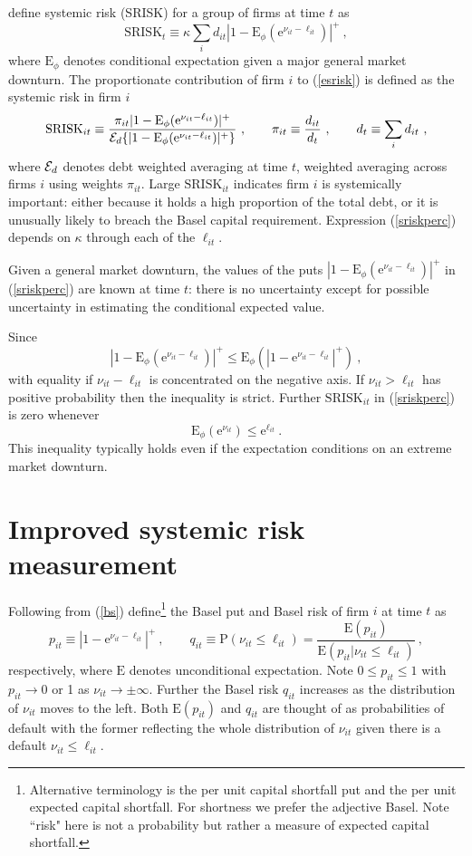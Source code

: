 \documentclass[authoryear]{elsarticle}
\newcommand{\E}{\mathrm{E}}
\newcommand{\p}{\mathrm{P}}
\newcommand{\e}{\mathrm{e}}
\newcommand{\Ex}{{\cal E}}
\newcommand{\Es}{\E_\phi}
\newcommand{\eref}[1]{(\ref{#1})}
\newcommand{\cq}{\ , \qquad}
\newcommand{\be}[1]{\begin{equation}\label{#1}}
\newcommand{\ee}{\end{equation}}
\begin{document}
 \cite{brownlees2015} define  systemic risk (SRISK) for a group of firms  at time $t$ as
\be{esrisk}
\mathrm{SRISK}_t\equiv\kappa\sum_i d_{it}|1-\Es(\e^{\nu_{it}-\ell_{it}})|^+ \ ,
\ee
where  $\Es$ denotes  conditional expectation given a major general market downturn.  The proportionate contribution of firm $i$  to \eref{esrisk} is defined as the systemic risk in firm $i$  
 \be{sriskperc}
 \mathrm{SRISK}_{it}\equiv \frac{\pi_{it}|1-\Es(\e^{\nu_{it}-\ell_{it}})|^+}{\Ex_d\{|1-\Es(\e^{\nu_{it}-\ell_{it}})|^+\}}\cq \pi_{it}\equiv \frac{d_{it}}{d_t}\cq d_t\equiv \sum_i d_{it}\ , 
 \ee
where $\Ex_d$ denotes  debt weighted averaging at time $t$,  weighted averaging across firms $i$  using weights $\pi_{it}$.     Large $\mathrm{SRISK}_{it}$ indicates firm $i$ is systemically important: either because it holds a high proportion of the total debt, or it is unusually likely to breach the Basel capital requirement.  Expression \eref{sriskperc} depends on $\kappa$ through each of the $\ell_{it}$.  

Given a general market downturn, the values of the puts $|1-\Es(\e^{\nu_{it}-\ell_{it}})|^+$  in \eref{sriskperc} are known at time $t$:  there is no uncertainty except for possible  uncertainty in estimating the conditional  expected value.

Since
$$
|1-\Es(\e^{\nu_{it}-\ell_{it}})|^+ \le\Es(|1-\e^{\nu_{it}-\ell_{it}}|^+)\ ,
$$
with equality  if  $\nu_{it}-\ell_{it}$ is concentrated on the negative axis.  If  $\nu_{it}>\ell_{it}$  has positive probability then the  inequality is strict.   Further $\mathrm{SRISK}_{it}$ in \eref{sriskperc}   is zero whenever
$$
\Es(\e^{\nu_{it}})\le\e^{\ell_{it}}\ .
$$
This inequality typically holds even if the expectation conditions on an extreme market downturn. 

\section{Improved systemic risk measurement}

Following from \eref{bs}   define\footnote{Alternative terminology is the per unit capital shortfall put and the per unit expected capital shortfall.  For shortness we prefer the adjective Basel.  Note ``risk" here is not a probability but rather a measure of expected capital shortfall.} the  Basel put and  Basel risk of firm $i$ at time $t$ as
\be{put}
p_{it}\equiv |1-\e^{\nu_{it}-\ell_{it}}|^+\cq q_{it}\equiv \p(\nu_{it}\le \ell_{it})=\frac{\E(p_{it})}{\E(p_{it}|\nu_{it}\le \ell_{it})}\ ,
\ee
respectively, where $\E$ denotes unconditional expectation.  Note $0\le p_{it}\le 1$ with $p_{it}\rightarrow 0$ or 1 as $\nu_{it}\rightarrow\pm\infty$.
Further the Basel risk  $q_{it}$ increases as the distribution of $\nu_{it}$ moves to the left.  Both $\E(p_{it})$ and $q_{it}$ are thought of as probabilities of default with the former reflecting the whole distribution of $\nu_{it}$ given there is a default $\nu_{it}\le\ell_{it}$.
\end{document}
